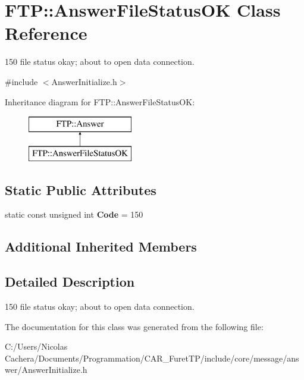 \hypertarget{classFTP_1_1AnswerFileStatusOK}{}\section{F\+T\+P\+:\+:Answer\+File\+Status\+O\+K Class Reference}
\label{classFTP_1_1AnswerFileStatusOK}


150 file status okay; about to open data connection.  




{\ttfamily \#include $<$Answer\+Initialize.\+h$>$}

Inheritance diagram for F\+T\+P\+:\+:Answer\+File\+Status\+O\+K\+:\begin{figure}[H]
\begin{center}
\leavevmode
\includegraphics[height=2.000000cm]{classFTP_1_1AnswerFileStatusOK}
\end{center}
\end{figure}
\subsection*{Static Public Attributes}
\begin{DoxyCompactItemize}
\item 
\hypertarget{classFTP_1_1AnswerFileStatusOK_abbcdece8e9af326b425d4d0ec456835b}{}static const unsigned int {\bfseries Code} = 150\label{classFTP_1_1AnswerFileStatusOK_abbcdece8e9af326b425d4d0ec456835b}

\end{DoxyCompactItemize}
\subsection*{Additional Inherited Members}


\subsection{Detailed Description}
150 file status okay; about to open data connection. 

The documentation for this class was generated from the following file\+:\begin{DoxyCompactItemize}
\item 
C\+:/\+Users/\+Nicolas Cachera/\+Documents/\+Programmation/\+C\+A\+R\+\_\+\+Furet\+T\+P/include/core/message/answer/Answer\+Initialize.\+h\end{DoxyCompactItemize}
